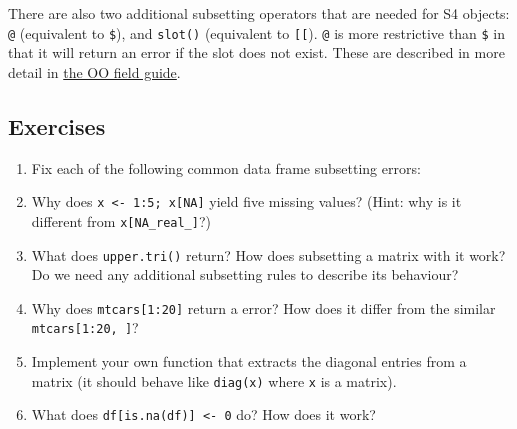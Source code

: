There are also two additional subsetting operators that are needed for
S4 objects: \texttt{@} (equivalent to \texttt{\$}), and \texttt{slot()}
(equivalent to \texttt{{[}{[}}). \texttt{@} is more restrictive than
\texttt{\$} in that it will return an error if the slot does not exist.
These are described in more detail in \hyperref[s4]{the OO field guide}.
  

\subsection{Exercises}

\begin{enumerate}
\def\labelenumi{\arabic{enumi}.}
\item
  Fix each of the following common data frame subsetting errors:

\begin{Shaded}
\begin{Highlighting}[]
\NormalTok{mtcars[mtcars$cyl =}\StringTok{ }\NormalTok{, ]}
\NormalTok{mtcars[-}\NormalTok{:}\NormalTok{, ]}
\NormalTok{mtcars[mtcars$cyl <=}\StringTok{ }\NormalTok{]}
\NormalTok{mtcars[mtcars$cyl ==}\StringTok{ } \NormalTok{|}\StringTok{ }\NormalTok{, ]}
\end{Highlighting}
\end{Shaded}
\item
  Why does \texttt{x \textless{}- 1:5; x{[}NA{]}} yield five missing
  values? (Hint: why is it different from \texttt{x{[}NA\_real\_{]}}?)
\item
  What does \texttt{upper.tri()} return? How does subsetting a matrix
  with it work? Do we need any additional subsetting rules to describe
  its behaviour?

\begin{Shaded}
\begin{Highlighting}[]
\StringTok{ }\NormalTok{(}\NormalTok{:}\NormalTok{, }\NormalTok{:}\NormalTok{, } \NormalTok{)}
\NormalTok{x[}\NormalTok{(x)]}
\end{Highlighting}
\end{Shaded}
\item
  Why does \texttt{mtcars{[}1:20{]}} return a error? How does it differ
  from the similar \texttt{mtcars{[}1:20, {]}}?
\item
  Implement your own function that extracts the diagonal entries from a
  matrix (it should behave like \texttt{diag(x)} where \texttt{x} is a
  matrix).
\item
  What does \texttt{df{[}is.na(df){]} \textless{}- 0} do? How does it
  work?
\end{enumerate}

